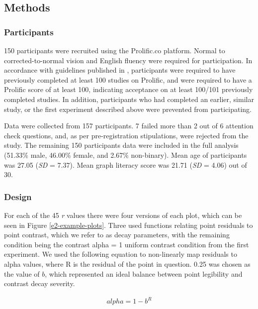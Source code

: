 \documentclass[preprint, 3p,
authoryear]{elsarticle} %
\begin{document}
\hypertarget{methods}{%
\subsection{Methods}\label{methods}}

\hypertarget{participants-1}{%
\subsubsection{Participants}\label{participants-1}}

150 participants were recruited using the Prolific.co platform. Normal
to corrected-to-normal vision and English fluency were required for
participation. In accordance with guidelines published in
\citep{peer_2021}, participants were required to have previously
completed at least 100 studies on Prolific, and were required to have a
Prolific score of at least 100, indicating acceptance on at least
100/101 previously completed studies. In addition, participants who had
completed an earlier, similar study, or the first experiment described
above were prevented from participating.

Data were collected from 157 participants. 7 failed more than 2 out of 6
attention check questions, and, as per pre-registration stipulations,
were rejected from the study. The remaining 150 participants data were
included in the full analysis (51.33\% male, 46.00\% female, and 2.67\%
non-binary). Mean age of participants was 27.05 (\emph{SD} = 7.37). Mean
graph literacy score was 21.71 (\emph{SD} = 4.06) out of 30.

\hypertarget{design-1}{%
\subsubsection{Design}\label{design-1}}

For each of the 45 \emph{r} values there were four versions of each
plot, which can be seen in Figure \ref{e2-example-plots}. Three used
functions relating point residuals to point contrast, which we refer to
as decay parameters, with the remaining condition being the contrast
alpha = 1 uniform contrast condition from the first experiment. We used
the following equation to non-linearly map residuals to alpha values,
where R is the residual of the point in question. 0.25 was chosen as the
value of \(b\), which represented an ideal balance between point
legibility and contrast decay severity.

\begin{align}
  alpha = 1 - b^R
\end{align}
\end{document}
